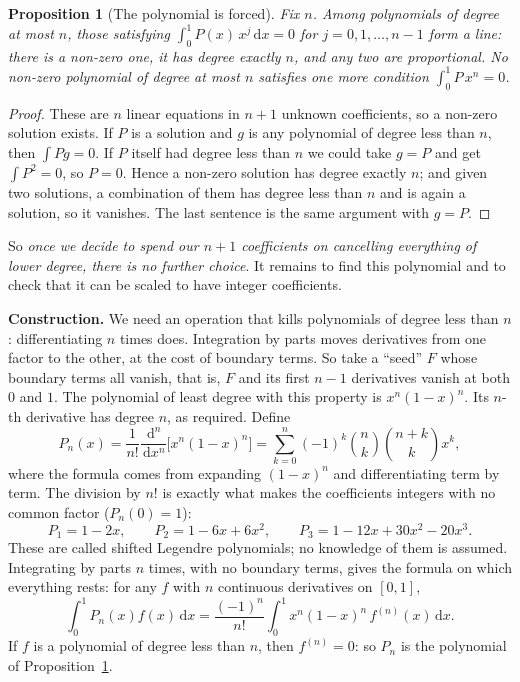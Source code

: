 \documentclass[11pt]{article}
\newcommand{\dd}{\,\mathrm d}
\newtheorem{proposition}[lemma]{Proposition}
\theoremstyle{remark}
\newcommand{\q}[1]{\medskip\noindent\textbf{#1}}
\begin{document}
\begin{proposition}[The polynomial is forced]\label{prop:forced}
Fix $n$. Among polynomials of degree at most $n$, those satisfying
$\int_0^1P(x)\,x^j\dd x=0$ for $j=0,1,\dots,n-1$ form a line: there is a non-zero one, it has degree
exactly $n$, and any two are proportional. No non-zero polynomial of degree at most $n$ satisfies one
more condition $\int_0^1P\,x^n=0$.
\end{proposition}
\begin{proof}
These are $n$ linear equations in $n+1$ unknown coefficients, so a non-zero solution exists. If $P$
is a solution and $g$ is any polynomial of degree less than $n$, then $\int Pg=0$. If $P$ itself
had degree less than $n$ we could take $g=P$ and get $\int P^2=0$, so $P=0$. Hence a non-zero
solution has degree exactly $n$; and given two solutions, a combination of them has degree less than
$n$ and is again a solution, so it vanishes. The last sentence is the same argument with $g=P$.
\end{proof}

So \emph{once we decide to spend our $n+1$ coefficients on cancelling everything of lower degree,
there is no further choice}. It remains to find this polynomial and to check that it can be scaled
to have integer coefficients.

\q{Construction.} We need an operation that kills polynomials of degree less than $n$:
differentiating $n$ times does. Integration by parts moves derivatives from one factor to the
other, at the cost of boundary terms. So take a ``seed'' $F$ whose boundary terms all vanish, that
is, $F$ and its first $n-1$ derivatives vanish at both $0$ and $1$. The polynomial of least degree
with this property is $x^n(1-x)^n$. Its $n$-th derivative has degree $n$, as required. Define
\begin{equation}\label{legendre}
P_n(x)=\frac1{n!}\frac{\dd^n}{\dd x^n}\bigl[x^n(1-x)^n\bigr]
=\sum_{k=0}^n(-1)^k\binom nk\binom{n+k}k x^k ,
\end{equation}
where the formula comes from expanding $(1-x)^n$ and differentiating term by term. The division by
$n!$ is exactly what makes the coefficients integers with no common factor ($P_n(0)=1$):
\[
P_1=1-2x,\qquad P_2=1-6x+6x^2,\qquad P_3=1-12x+30x^2-20x^3 .
\]
These are called shifted Legendre polynomials; no knowledge of them is assumed. Integrating by parts
$n$ times, with no boundary terms, gives the formula on which everything rests: for any $f$ with
$n$ continuous derivatives on $[0,1]$,
\begin{equation}\label{ibp}
\int_0^1P_n(x)f(x)\dd x=\frac{(-1)^n}{n!}\int_0^1x^n(1-x)^n\,f^{(n)}(x)\dd x .
\end{equation}
If $f$ is a polynomial of degree less than $n$, then $f^{(n)}=0$: so $P_n$ is the polynomial of
Proposition~\ref{prop:forced}.
\end{document}
